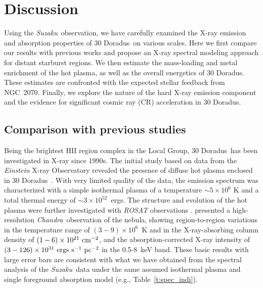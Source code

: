 \documentclass[usenatbib]{mnras}
\def\xs{30 Doradus}
\def\suzaku{{\sl Suzaku}}
\def\chandra{{\sl Chandra}}
\begin{document}
\section{Discussion}
\label{s:dis}

Using the \suzaku\ observation, we have carefully examined the X-ray emission and absorption properties of \xs\ on various scales. Here we first compare our results with previous works and propose an X-ray spectral modeling approach for distant starburst regions. We then estimate the mass-loading and metal enrichment of the hot plasma, as well as the overall energetics of \xs. These estimates are confronted with the expected stellar feedback from NGC~2070. Finally, we explore the nature of the hard X-ray emission component and the evidence for significant cosmic ray (CR) acceleration in \xs.  

\subsection{Comparison with previous studies}
\label{ss:com}
Being the brightest HII region complex in the Local Group, \xs\ has been investigated in X-ray since 1990s.  The initial study based on data from the {\sl Einstein} X-ray Observatory revealed the presence of diffuse hot plasma enclosed in \xs~\citep{Wang2}. With very limited quality of the data, the emission spectrum was characterized with a simple isothermal plasma of a temperature $\sim 5 \times 10^6$ K and a total thermal energy of $\sim 3 \times 10^{52}$~ergs. The structure and evolution of the hot plasma were further investigated with {\sl ROSAT} observations 
\citep{Wang2}. \citet{Townsley1} presented a high-resolution \chandra\ observation of the nebula, showing region-to-region variations in the temperature range of $(3-9) \times 10^6$~K and in the X-ray-absorbing column density of $(1-6)\times10^{21} {\rm~cm^{-2}}$, and the absorption-corrected X-ray intensity of $(3-126)\times10^{31} {\rm~ergs~s^{-1}~pc^{-2}}$ in the 0.5-8~keV band. These basic results with large error bars are consistent with what we have obtained from the spectral analysis of the \suzaku\ data under the same assumed isothermal plasma and single foreground absorption model (e.g., Table~\ref{t:spec_indi}).
\end{document}
